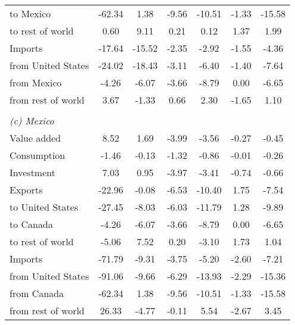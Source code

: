 \begin{table}[p]
\begin{center}
\begin{tabular}{lcccccc}
\quad to Mexico& -62.34& 1.38& -9.56& -10.51& -1.33& -15.58\\
\quad to rest of world& 0.60& 9.11& 0.21& 0.12& 1.37& 1.99\\
Imports& -17.64& -15.52& -2.35& -2.92& -1.55& -4.36\\
\quad from United States& -24.02& -18.43& -3.11& -6.40& -1.40& -7.64\\
\quad from Mexico& -4.26& -6.07& -3.66& -8.79& 0.00& -6.65\\
\quad from rest of world& 3.67& -1.33& 0.66& 2.30& -1.65& 1.10\\
\\
\multicolumn{6}{l}{\textit{(c) Mexico}}\\
Value added& 8.52& 1.69& -3.99& -3.56& -0.27& -0.45\\
Consumption& -1.46& -0.13& -1.32& -0.86& -0.01& -0.26\\
Investment& 7.03& 0.95& -3.97& -3.41& -0.74& -0.66\\
Exports& -22.96& -0.08& -6.53& -10.40& 1.75& -7.54\\
\quad to United States& -27.45& -8.03& -6.03& -11.79& 1.28& -9.89\\
\quad to Canada& -4.26& -6.07& -3.66& -8.79& 0.00& -6.65\\
\quad to rest of world& -5.06& 7.52& 0.20& -3.10& 1.73& 1.04\\
Imports& -71.79& -9.31& -3.75& -5.20& -2.60& -7.21\\
\quad from United States& -91.06& -9.66& -6.29& -13.93& -2.29& -15.36\\
\quad from Canada& -62.34& 1.38& -9.56& -10.51& -1.33& -15.58\\
\quad from rest of world& 26.33& -4.77& -0.11& 5.54& -2.67& 3.45\\
\bottomrule
\end{tabular}
\normalsize
\end{center}
\end{table}
